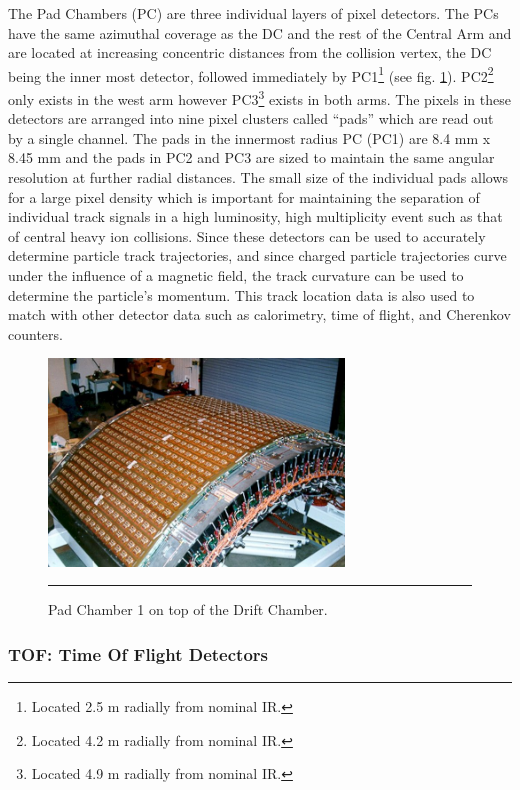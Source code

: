 The Pad Chambers \citep{PCfocus} (PC) are three individual layers of pixel detectors. The PCs have the same azimuthal coverage as the DC and the rest of the Central Arm and are located at increasing concentric distances from the collision vertex, the DC being the inner most detector, followed immediately by PC1\footnote{Located 2.5 m radially from nominal IR.} (see fig. \ref{fig:pcdiagram}). PC2\footnote{Located 4.2 m radially from nominal IR.} only exists in the west arm however PC3\footnote{Located 4.9 m radially from nominal IR.} exists in both arms. The pixels in these detectors are arranged into nine pixel clusters called ``pads'' which are read out by a single channel. The pads in the innermost radius PC (PC1) are 8.4 mm x 8.45 mm and the pads in PC2 and PC3 are sized to maintain the same angular resolution at further radial distances. The small size of the individual pads allows for a large pixel density which is important for maintaining the separation of individual track signals in a high luminosity, high multiplicity event such as that of central heavy ion collisions. Since these detectors can be used to accurately determine particle track trajectories, and since charged particle trajectories curve under the influence of a magnetic field, the track curvature can be used to determine the particle's momentum. This track location data is also used to match with other detector data such as calorimetry, time of flight, and Cherenkov counters.
\begin{figure}[htbp]
  \centering
    \includegraphics[width=0.7\textwidth]{Figures/PC1.jpg}
    \rule{35em}{0.5pt}
  \caption[Pad Chamber 1 on top of the Drift Chamber.]{Pad Chamber 1 on top of the Drift Chamber.}
  \label{fig:pcdiagram}
\end{figure}

\subsubsection{TOF: Time Of Flight Detectors}

